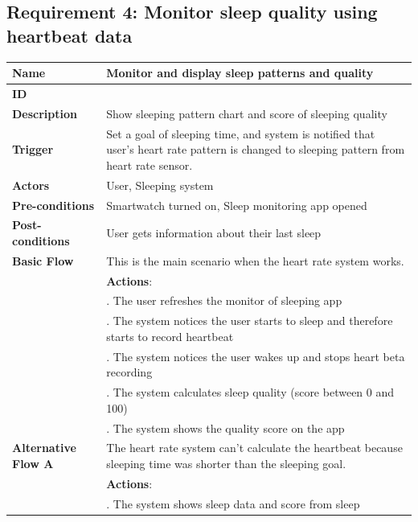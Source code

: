 \documentclass{article}
\begin{document}
	
	\subsection{Requirement 4: Monitor sleep quality using heartbeat data}
	\vspace{1em}
	\begin{center}
		\small
		\begin{tabularx}{1.0\textwidth}{|>{\raggedright\arraybackslash}p{}|>{\raggedright\arraybackslash}X|}
			\hline
			\textbf{Name}               & Monitor and display sleep patterns and quality \\ \hline
			\textbf{ID}                 & 4 \\ \hline
			\textbf{Description}        & Show sleeping pattern chart and score of sleeping quality \\ \hline
			\textbf{Trigger}            & Set a goal of sleeping time, and system is notified that user's heart rate pattern is changed to sleeping pattern from heart rate sensor. \\ \hline
			\textbf{Actors}             & User, Sleeping system \\ \hline
			\textbf{Pre-conditions}     & Smartwatch turned on, Sleep monitoring app opened \\ \hline
			\textbf{Post-conditions}    & User gets information about their last sleep \\ \hline
			\textbf{Basic Flow}         & This is the main scenario when the heart rate system works. \\ \hline
										& \textbf{Actions}: \\
										& 1. The user refreshes the monitor of sleeping app \\
										& 2. The system notices the user starts to sleep and therefore starts to record heartbeat \\
										& 3. The system notices the user wakes up and stops heart beta recording \\
										& 4. The system calculates sleep quality (score between 0 and 100) \\
										& 5. The system shows the quality score on the app \\ \hline
			\textbf{Alternative Flow A} & The heart rate system can't calculate the heartbeat because sleeping time was shorter than the sleeping goal. \\ \hline
										& \textbf{Actions}: \\
										& 1. The system shows sleep data and score from sleep \\

\end{tabularx}
\end{center}
\end{document}
